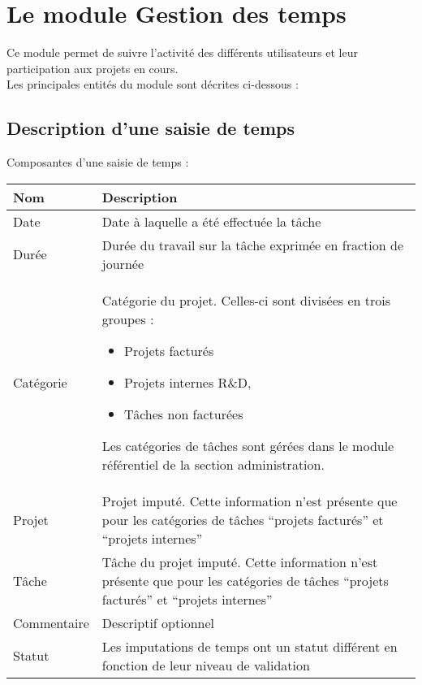 
\clearpage
\section{Le module Gestion des temps}

Ce module permet de suivre l'activité des différents utilisateurs et leur participation aux projets en cours.\\

Les principales entités du module \timemanager sont décrites ci-dessous :

\subsection{Description d'une saisie de temps}

Composantes d'une saisie de temps :\\

\begin{tabular}{|p{3cm}|p{10cm}|}
\hline
\textbf{Nom} & \textbf{Description} \\
\hline
Date & Date à laquelle a été effectuée la tâche\\
\hline
Durée & Durée du travail sur la tâche exprimée en fraction de journée\\
\hline
Catégorie & Catégorie du projet. Celles-ci sont divisées en trois groupes :
\begin{itemize}
\item Projets facturés
\item Projets internes R\&D,
\item Tâches non facturées
\end{itemize}
Les catégories de tâches sont gérées dans le module référentiel de la section administration.\\
\hline
Projet & Projet imputé. Cette information n'est présente que pour les catégories de tâches ``projets facturés'' et ``projets internes''\\
\hline
Tâche & Tâche du projet imputé. Cette information n'est présente que pour les catégories de tâches ``projets facturés'' et ``projets internes''\\
\hline
Commentaire & Descriptif optionnel\\
\hline
Statut & Les imputations de temps ont un statut différent en fonction de leur niveau de validation\\
\hline
\end{tabular}
\vspace{0.3cm}


